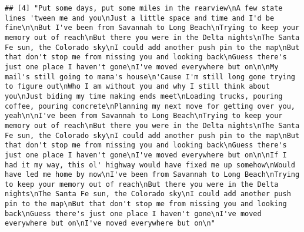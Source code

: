 \documentclass[]{article}
\begin{document}
\begin{verbatim}
## [4] "Put some days, put some miles in the rearview\nA few state lines 'tween me and you\nJust a little space and time and I'd be fine\n\nBut I've been from Savannah to Long Beach\nTrying to keep your memory out of reach\nBut there you were in the Delta nights\nThe Santa Fe sun, the Colorado sky\nI could add another push pin to the map\nBut that don't stop me from missing you and looking back\nGuess there's just one place I haven't gone\nI've moved everywhere but on\n\nMy mail's still going to mama's house\n'Cause I'm still long gone trying to figure out\nWho I am without you and why I still think about you\nJust biding my time making ends meet\nLoading trucks, pouring coffee, pouring concrete\nPlanning my next move for getting over you, yeah\n\nI've been from Savannah to Long Beach\nTrying to keep your memory out of reach\nBut there you were in the Delta nights\nThe Santa Fe sun, the Colorado sky\nI could add another push pin to the map\nBut that don't stop me from missing you and looking back\nGuess there's just one place I haven't gone\nI've moved everywhere but on\n\nIf I had it my way, this ol' highway would have fixed me up somehow\nWould have led me home by now\nI've been from Savannah to Long Beach\nTrying to keep your memory out of reach\nBut there you were in the Delta nights\nThe Santa Fe sun, the Colorado sky\nI could add another push pin to the map\nBut that don't stop me from missing you and looking back\nGuess there's just one place I haven't gone\nI've moved everywhere but on\nI've moved everywhere but on\n"                                                                                                                                                                                                               

\end{verbatim}
\end{document}
